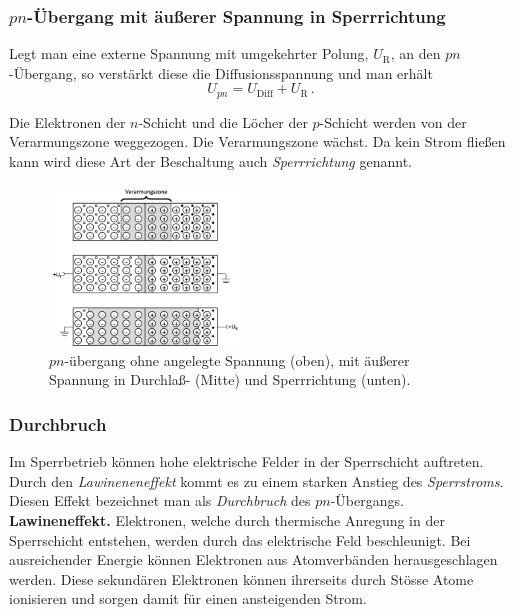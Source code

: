 \subsubsection{$pn$-Übergang mit äußerer Spannung in Sperrrichtung}

Legt man eine externe Spannung mit umgekehrter Polung,
$U_{\mathrm{R}}$, an den $pn$-Übergang, so verstärkt diese die
Diffusionsspannung und man erhält
%
\begin{equation}
U_{pn} = U_{\mathrm{Diff}} + U_{\mathrm{R}} \, .
\end{equation}

Die Elektronen der $n$-Schicht und die Löcher der $p$-Schicht werden
von der Verarmungszone weggezogen. Die Verarmungszone wächst. Da
kein Strom fließen kann wird diese Art der Beschaltung auch {\it
Sperrrichtung} genannt.

\begin{figure}[ht!]
\begin{center}
\includegraphics[width=0.45\textwidth]{Abbildungen/pn_Uebergang.jpg}
\end{center}
\caption{$pn$-übergang ohne angelegte Spannung (oben), mit äußerer Spannung in Durchlaß- (Mitte) und Sperrrichtung (unten).}
\label{fig:Verarmung}
\end{figure}

\subsubsection{Durchbruch}

Im Sperrbetrieb können hohe elektrische Felder in der Sperrschicht
auftreten. Durch den {\it Lawineneneffekt} kommt
es zu einem starken Anstieg des {\it Sperrstroms}. Diesen Effekt bezeichnet 
man als {\it Durchbruch} des $pn$-Übergangs.\\

\noindent
\textbf{Lawineneffekt.} 
%
Elektronen, welche durch thermische Anregung in der Sperrschicht entstehen,
werden durch das elektrische Feld beschleunigt. Bei ausreichender
Energie können Elektronen aus Atomverbänden herausgeschlagen
werden. Diese sekundären Elektronen können ihrerseits durch
Stösse Atome ionisieren und sorgen damit für einen ansteigenden
Strom.

